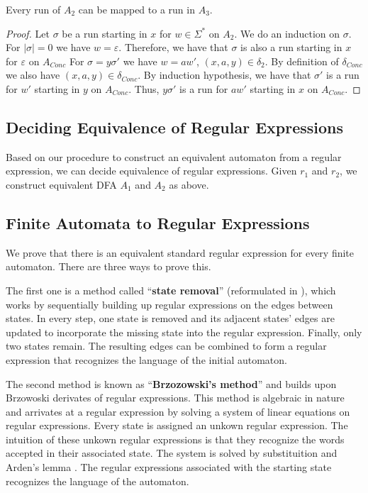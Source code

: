 \begin{lemma}
    \label{dfa_conc_cont}
    Every run of $A_2$ can be mapped to a run in $A_3$.
\end{lemma}
\begin{proof}
    Let $\sigma$ be a run starting in $x$ for $w \in \Sigma^*$ on $A_2$.
    We do an induction on $\sigma$.
    For $|\sigma| = 0$%
    we have $w = \varepsilon$.
    Therefore, we have that $\sigma$ is also a run starting in $x$ for $\varepsilon$ on $A_{Conc}$
    For $\sigma = y\sigma'$ we have $w = aw'$, $(x, a, y) \in \delta_2$.
    By definition of $\delta_{Conc}$ we also have $(x, a, y) \in \delta_{Conc}$.
    By induction hypothesis, we have that $\sigma'$ is a run for $w'$ starting in $y$ on $A_{Conc}$.
    Thus, $y\sigma'$ is a run for $aw'$ starting in $x$ on $A_{Conc}$.
\end{proof}


\subsection{Deciding Equivalence of Regular Expressions}

 
Based on our procedure to construct an equivalent automaton from a regular expression, we can decide equivalence of regular expressions. Given $r_1$ and $r_2$, we construct equivalent DFA $A_1$ and $A_2$ as above.


\subsection{Finite Automata to Regular Expressions}
We prove that there is an equivalent standard regular expression for every finite automaton.
There are three ways to prove this. 


The first one is a method called ``\textbf{state removal}'' \cite{SignalFlow} (reformulated in \cite{springerlink:10.1007/978-3-540-30500-2}),
which works by sequentially building up regular expressions on the edges between states. 
In every step, one state is removed and its adjacent states' edges are updated to incorporate the missing state into the regular expression.
Finally, only two states remain. The resulting edges can be combined to form a regular expression that recognizes the language of the initial automaton.


The second method is known as ``\textbf{Brzozowski's method}'' \cite{DBLP:journals/jacm/Brzozowski64} and builds upon Brzowoski derivates of regular expressions.
This method is algebraic in nature and arrivates at a regular expression by solving a system of linear equations on regular expressions. 
Every state is assigned an unkown regular expression. 
The intuition of these unkown regular expressions is that they recognize the words accepted in their associated state. 
The system is solved by substituition and Arden's lemma \cite{DBLP:conf/focs/Arden61}.
The regular expressions associated with the starting state recognizes the language of the automaton.


